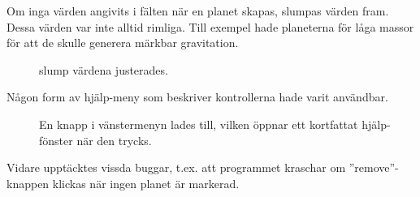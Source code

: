 \begin{description}
    \item[Om inga värden angivits i fälten när en planet skapas, slumpas värden 
    fram. Dessa värden var inte alltid rimliga.
    Till exempel hade planeterna för låga massor för att de skulle generera
    märkbar gravitation.]
    slump värdena justerades.

    \item[Någon form av hjälp-meny som beskriver kontrollerna hade
    varit användbar.]
    En knapp i vänstermenyn lades till, vilken öppnar ett kortfattat
    hjälp-fönster när den trycks.

\end{description}

Vidare upptäcktes vissda buggar, t.ex. att programmet kraschar om
''remove''-knappen klickas när ingen planet är markerad.



